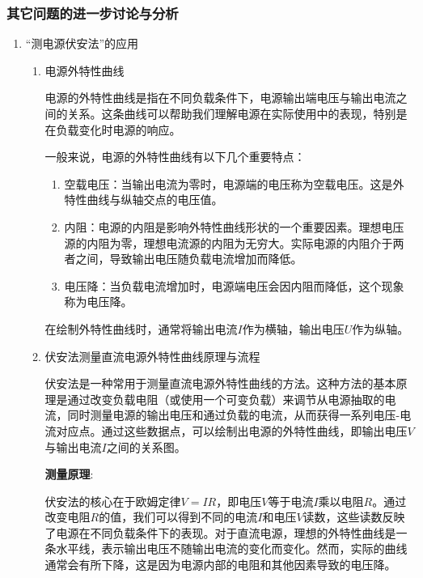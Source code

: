 \documentclass[dvipsnames, svgnames,a4paper,11pt]{article}
\begin{document}
	\subsubsection{其它问题的进一步讨论与分析}
	\begin{enumerate}
		\item “测电源伏安法”的应用
		\begin{enumerate}
			\item 电源外特性曲线

				电源的外特性曲线是指在不同负载条件下，电源输出端电压与输出电流之间的关系。这条曲线可以帮助我们理解电源在实际使用中的表现，特别是在负载变化时电源的响应。

				一般来说，电源的外特性曲线有以下几个重要特点：
				\begin{enumerate}
					\item 空载电压：当输出电流为零时，电源端的电压称为空载电压。这是外特性曲线与纵轴交点的电压值。
					\item 内阻：电源的内阻是影响外特性曲线形状的一个重要因素。理想电压源的内阻为零，理想电流源的内阻为无穷大。实际电源的内阻介于两者之间，导致输出电压随负载电流增加而降低。
					\item 电压降：当负载电流增加时，电源端电压会因内阻而降低，这个现象称为电压降。

				\end{enumerate}
				
				在绘制外特性曲线时，通常将输出电流$I$作为横轴，输出电压$U$作为纵轴。
			\item 伏安法测量直流电源外特性曲线原理与流程

			
			伏安法是一种常用于测量直流电源外特性曲线的方法。这种方法的基本原理是通过改变负载电阻（或使用一个可变负载）来调节从电源抽取的电流，同时测量电源的输出电压和通过负载的电流，从而获得一系列电压-电流对应点。通过这些数据点，可以绘制出电源的外特性曲线，即输出电压$V$与输出电流$I$之间的关系图。
			
			\textbf{测量原理}:
			
			伏安法的核心在于欧姆定律$V = IR$，即电压$V$等于电流$I$乘以电阻$R$。通过改变电阻$R$的值，我们可以得到不同的电流$I$和电压$V$读数，这些读数反映了电源在不同负载条件下的表现。对于直流电源，理想的外特性曲线是一条水平线，表示输出电压不随输出电流的变化而变化。然而，实际的曲线通常会有所下降，这是因为电源内部的电阻和其他因素导致的电压降。
			

\end{enumerate}
\end{enumerate}
\end{document}

